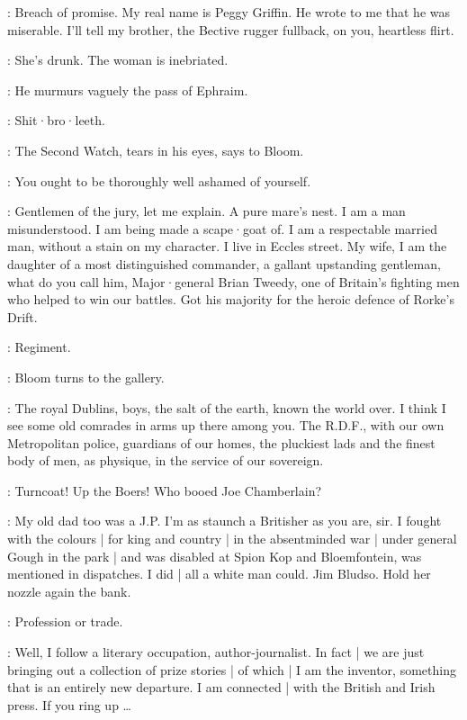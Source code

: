\Martha:
Breach of promise.
My real name is Peggy Griffin.
He wrote to me that he was miserable.
I'll tell my brother,
the Bective rugger fullback,
on you,
heartless flirt.

\Bloom:
She's drunk.
The woman is inebriated.

:
He murmurs vaguely the pass of Ephraim.

\Bloom:
Shit·bro·leeth.

:
The Second Watch,
tears in his eyes,
says to Bloom.

\SecondWatch:
You ought to be thoroughly well ashamed of yourself.

\Bloom:
Gentlemen of the jury,
let me explain.
A pure mare's nest.
I am a man misunderstood.
I am being made a scape·goat of.
I am a respectable married man,
without a stain on my character.
I live in Eccles street.
My wife,
I am the daughter of a most distinguished commander,
a gallant upstanding gentleman,
what do you call him,
Major·general Brian Tweedy,
one of Britain's fighting men who helped to win our battles.
Got his majority for the heroic defence of Rorke's Drift.

\FirstWatch:
Regiment.

:
Bloom turns to the gallery.

\Bloom:
The royal Dublins,
boys,
the salt of the earth,
known the world over.
I think I see some old comrades in arms up there among you.
The R.D.F.,
with our own Metropolitan police,
guardians of our homes,
the pluckiest lads and the finest body of men,
as physique,
in the service of our sovereign.

\Voice:
Turncoat!
Up the Boers!
Who booed Joe Chamberlain?

\Bloom:
My old dad too was a J.P.
I'm as staunch a Britisher as you are,
sir.
I fought with the colours |
for king and country |
in the absentminded war |
under general Gough in the park |
and was disabled at Spion Kop and Bloemfontein,
was mentioned in dispatches.
I did |
all a white man could.
Jim Bludso.
Hold her nozzle again the bank.

\FirstWatch:
Profession or trade.

\Bloom:
Well,
I follow a literary occupation,
author-journalist.
In fact |
we are just bringing out a collection of prize stories |
of which |
I am the inventor,
something that is an entirely new departure.
I am connected |
with the British and Irish press.
If you ring up \ldots

